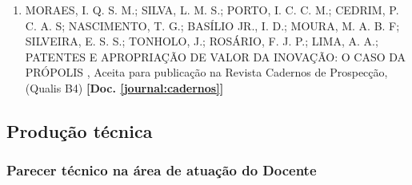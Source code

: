 \documentclass[a4paper,oneside,10pt]{article}
\begin{document}
\begin{enumerate}
\renewcommand{\labelenumi}{{\large\bfseries\arabic{enumi}.}}

\item MORAES, I. Q. S. M.; SILVA, L. M. S.; PORTO, I. C. C. M.; CEDRIM, P. C. A. S; NASCIMENTO, T. G.;  BASÍLIO JR., I. D.; MOURA, M. A. B. F; SILVEIRA, E. S. S.; TONHOLO, J.;  ROSÁRIO, F. J. P.; LIMA, A. A.; PATENTES E APROPRIAÇÃO DE VALOR DA INOVAÇÃO: O CASO DA PRÓPOLIS , Aceita para publicação na Revista Cadernos de Prospecção, {(Qualis B4)} \textbf{[Doc. \ref{journal:cadernos}]}

\end{enumerate}


\subsection{Produção técnica}
\vspace{0.3cm}


\subsubsection{Parecer técnico na área de atuação do Docente}
\vspace{0.3cm}
\end{document}
